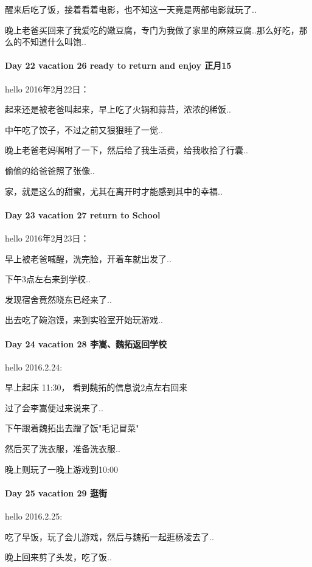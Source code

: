 \documentclass[UTF8,a4paper,8pt]{ctexbook}
\begin{document}
	 	 醒来后吃了饭，接着看着电影，也不知这一天竟是两部电影就玩了..
	 	 
	 	 晚上老爸买回来了我爱吃的嫩豆腐，专门为我做了家里的麻辣豆腐..那么好吃，那么的不知道什么叫饱..
 	 \paragraph{Day 22  vacation 26   \quad   ready to return and enjoy 正月15  }
	 	 hello 2016年2月22日：
	 	 
	 	 起来还是被老爸叫起来，早上吃了火锅和蒜苔，浓浓的稀饭..
	 	 
	 	 中午吃了饺子，不过之前又狠狠睡了一觉..
	 	 
	 	 晚上老爸老妈嘱咐了一下，然后给了我生活费，给我收拾了行囊..
	 	 
	 	 偷偷的给爸爸照了张像..
	 	 
	 	 家，就是这么的甜蜜，尤其在离开时才能感到其中的幸福..
 	 \paragraph{Day 23  vacation 27   \quad   return to School  }
	 	 hello  2016年2月23日：
	 	 
	 	 早上被老爸喊醒，洗完脸，开着车就出发了..
	 	 
	 	 下午3点左右来到学校..
	 	 
	 	 发现宿舍竟然晓东已经来了..
	 	 
	 	 出去吃了碗泡馍，来到实验室开始玩游戏..
 	 \paragraph{Day 24  vacation 28    \quad   李嵩、魏拓返回学校  }
	 	 hello 2016.2.24:
	 	 
	 	 早上起床 11:30， 看到魏拓的信息说2点左右回来
	 	 
	 	 过了会李嵩便过来说来了..
	 	 
	 	 下午跟着魏拓出去蹭了饭"毛记冒菜"
	 	 
	 	 然后买了洗衣服，准备洗衣服..
	 	 
	 	 晚上则玩了一晚上游戏到10:00
 	 \paragraph{Day 25  vacation 29    \quad   逛街  }
	 	 hello 2016.2.25:
	 	 
	 	 吃了早饭，玩了会儿游戏，然后与魏拓一起逛杨凌去了..
	 	 
	 	 晚上回来剪了头发，吃了饭..
	 	 
\end{document}
